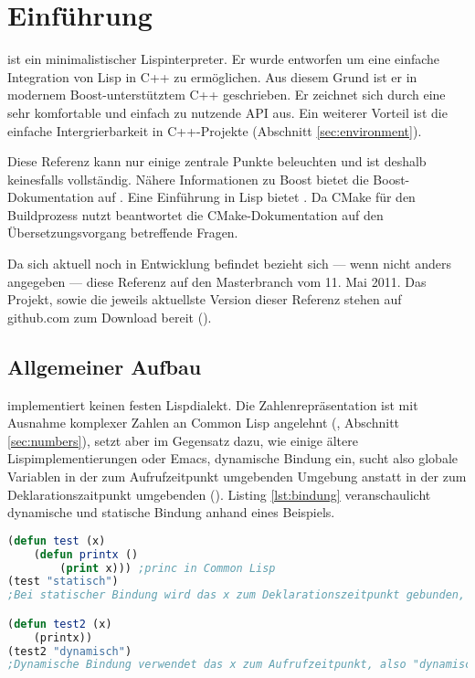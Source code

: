 \section{Einführung}
\label{sec:einfuehrung}

\projectname{} ist ein minimalistischer Lispinterpreter. Er wurde entworfen um eine einfache
Integration von Lisp in C++ zu ermöglichen. Aus diesem Grund ist er in modernem Boost-unterstütztem
C++ geschrieben. Er zeichnet sich durch eine sehr komfortable und einfach zu nutzende API aus.
Ein weiterer Vorteil ist die einfache Intergrierbarkeit in C++-Projekte (Abschnitt \ref{sec:environment}).

Diese Referenz kann nur einige zentrale Punkte beleuchten und ist deshalb keinesfalls vollständig. Nähere Informationen zu Boost bietet die Boost-Do\-ku\-men\-ta\-tion auf \cite{smart_ptr_online}. Eine Einführung in Lisp bietet \cite{graham_ansi_1995}. Da \projectname{} CMake für den Buildprozess nutzt beantwortet die CMake-Dokumentation auf \cite{cmake_online} den Übersetzungsvorgang betreffende Fragen.

Da sich \projectname{} aktuell noch in Entwicklung befindet bezieht sich --- wenn nicht anders angegeben --- diese Referenz auf den Masterbranch vom 11. Mai 2011.
Das Projekt, sowie die jeweils aktuellste Version dieser Referenz stehen auf github.com zum Download bereit (\cite{lisp_interaction_online}\cite{lisp_interaction_ref_online}). %

\subsection{Allgemeiner Aufbau}


\projectname{} implementiert keinen festen Lispdialekt. Die Zahlenrepräsentation ist mit Ausnahme komplexer Zahlen an Common Lisp angelehnt (\cite[S. 143ff]{graham_ansi_1995}, Abschnitt \ref{sec:numbers}), setzt aber im Gegensatz dazu, wie einige ältere Lispimplementierungen oder Emacs, dynamische Bindung ein, sucht also globale Variablen in der zum Aufrufzeitpunkt umgebenden Umgebung anstatt in der zum Deklarationszaitpunkt umgebenden (\cite[36, 63]{wilhelm_uebersetzerbau_2007}\cite[112]{graham_ansi_1995}). Listing \ref{lst:bindung} veranschaulicht dynamische und statische Bindung anhand eines Beispiels.

\begin{lstlisting}[caption={dynamische Bindung}, label=lst:bindung, language=Lisp]
(defun test (x)
    (defun printx ()
        (print x))) ;princ in Common Lisp
(test "statisch")
;Bei statischer Bindung wird das x zum Deklarationszeitpunkt gebunden, also "statisch"

(defun test2 (x)
    (printx))
(test2 "dynamisch")
;Dynamische Bindung verwendet das x zum Aufrufzeitpunkt, also "dynamisch"
\end{lstlisting}

